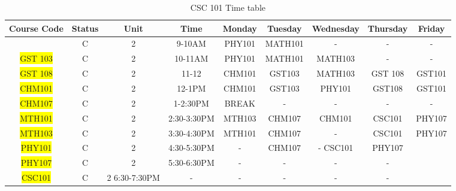 \documentclass{article}
\begin{document}
	\begin{table}[h!]
		\begin{center}
		\caption{CSC 101 Time table}
		\label{tab:table1}
		\begin{tabular}{c|c|c|c|c|c|c|c|c}
		 \hline
		 \textbf{Course Code} & \textbf{Status} & \textbf{Unit}
		 & \textbf{Time} & \textbf{Monday} & \textbf{Tuesday} & \textbf{Wednesday} & \textbf{Thursday} & \textbf{Friday}\\
		 \hline
		\cellcolor{color}{GST 101} & C & 2 & 9-10AM & PHY101 & MATH101 & - & - & -\\
			\colorbox{yellow}{GST 103} & C & 2 & 10-11AM & PHY101 & MATH101 & MATH103 & - & - \\
		 	\colorbox{yellow}{GST 108} & C & 2 & 11-12 & CHM101 & GST103 &  MATH103 & GST 108 & GST101\\
	      	\colorbox{yellow}{CHM101} & C & 2 & 12-1PM & CHM101 & GST103 & PHY101 & GST108 & GST101\\
		 	\colorbox{yellow}{CHM107} & C & 2 & 1-2:30PM & BREAK & - & - & - & - \\
		 	\colorbox{yellow}{MTH101} & C & 2 & 2:30-3:30PM & MTH103 & CHM107 & CHM101 & CSC101 & PHY107\\
		 		\colorbox{yellow}{MTH103} & C & 2 & 3:30-4:30PM & MTH101 & CHM107 & - & CSC101 & PHY107\\
		 		\colorbox{yellow}{PHY101} & C & 2 & 4:30-5:30PM & - & CHM107 & - CSC101 & PHY107\\
		 	\colorbox{yellow}{PHY107} & C & 2 & 5:30-6:30PM & - & - & - & - & \\
		 	\colorbox{yellow}{CSC101} & C & 2 6:30-7:30PM & - & - & - & - & - \\
		 	
		 
		 
		\end{tabular}
		\end{center}
	\end{table}
\end{document}
